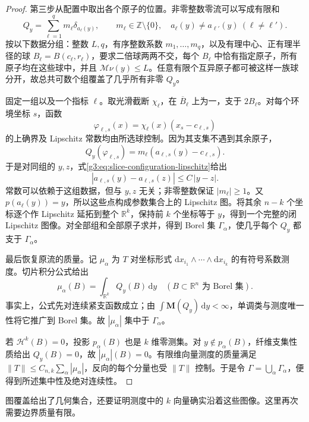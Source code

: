 \begin{proof}
	第三步从配置中取出各个原子的位置。非零整数零流可以写成有限和
	\[
		Q_y=\sum_{\ell=1}^{q}m_\ell\delta_{a_\ell(y)},
		\qquad m_\ell\in\mathbb Z\setminus\{0\},
		\quad a_\ell(y)\ne a_{\ell'}(y)\ (\ell\ne\ell').
	\]
	按以下数据分组：整数 \(L,q\)，有序整数系数 \(m_1,\ldots,m_q\)，以及有理中心、正有理半径的球 \(B_\ell=B(c_\ell,r_\ell)\)，要求二倍球两两不交，每个 \(B_\ell\) 中恰有指定原子，所有原子均在这些球中，并且 \(\mathcal M\nu(y)\le L\)。任意有限个互异原子都可被这样一族球分开，故总共可数个组覆盖了几乎所有非零 \(Q_y\)。

	固定一组以及一个指标 \(\ell\)。取光滑截断 \(\chi_\ell\)，在 \(\overline B_\ell\) 上为一，支于 \(2B_\ell\)。对每个环境坐标 \(s\)，函数
	\[
		\varphi_{\ell,s}(x)=\chi_\ell(x)(x_s-c_{\ell,s})
	\]
	的上确界及 Lipschitz 常数均由所选球控制。因为其支集不遇到其余原子，
	\[
		Q_y(\varphi_{\ell,s})=m_\ell(a_{\ell,s}(y)-c_{\ell,s}).
	\]
	于是对同组的 \(y,z\)，式\eqref{g3:eq:slice-configuration-lipschitz}给出
	\[
		|a_{\ell,s}(y)-a_{\ell,s}(z)|
		\le C\,|y-z|.
	\]
	常数可以依赖于这组数据，但与 \(y,z\) 无关；非零整数保证 \(|m_\ell|\ge1\)。又 \(p(a_\ell(y))=y\)，所以这些点构成参数集合上的 Lipschitz 图。将其余 \(n-k\) 个坐标逐个作 Lipschitz 延拓到整个 \(\mathbb R^k\)，保持前 \(k\) 个坐标等于 \(y\)，得到一个完整的闭 Lipschitz 图像。对全部组和全部原子求并，得到 Borel 集 \(\Gamma_\alpha\)，使几乎每个 \(Q_y\) 都支于 \(\Gamma_\alpha\)。

	最后恢复原流的质量。记 \(\mu_\alpha\) 为 \(T\) 对坐标形式
	\(\mathrm dx_{i_1}\wedge\cdots\wedge\mathrm dx_{i_k}\) 的有符号系数测度。切片积分公式给出
	\begin{equation}\label{g3:eq:coordinate-current-measure-disintegration}
		\mu_\alpha(B)=\int_{\mathbb R^k}Q_y(B)\,\mathrm dy
		\quad(B\subset\mathbb R^n\text{ 为 Borel 集}).
	\end{equation}
	事实上，公式先对连续紧支函数成立；由
	\(\int\mathbf M(Q_y)\,\mathrm dy<\infty\)，单调类与测度唯一性将它推广到 Borel 集。故 \(|\mu_\alpha|\) 集中于 \(\Gamma_\alpha\)。

	若 \(\mathcal H^k(B)=0\)，投影 \(p_\alpha(B)\) 也是 \(k\) 维零测集。对 \(y\notin p_\alpha(B)\)，纤维支集性质给出 \(Q_y(B)=0\)，故 \(|\mu_\alpha|(B)=0\)。有限维向量测度的质量满足
	\(\|T\|\le C_{n,k}\sum_\alpha|\mu_\alpha|\)，反向的每个分量也受 \(\|T\|\) 控制。于是令
	\(\Gamma=\bigcup_\alpha\Gamma_\alpha\)，便得到所述集中性及绝对连续性。
\end{proof}

图覆盖给出了几何集合，还要证明测度中的 \(k\) 向量确实沿着这些图像。这里再次需要边界质量有限。

